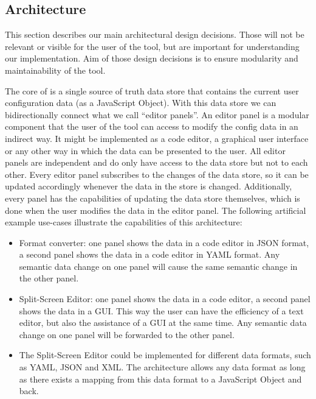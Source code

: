 




\subsection{Architecture}\label{subsec:architecture} %
This section describes our main architectural design decisions.
Those will not be relevant or visible for the user of the tool, but are important for understanding our implementation.
Aim of those design decisions is to ensure modularity and maintainability of the tool.

The core of \toolname{} is a single source of truth data store that contains the current user configuration data (as a JavaScript Object).
With this data store we can bidirectionally connect what we call ``editor panels''.
An editor panel is a modular component that the user of the tool can access to modify the config data in an indirect way.
It might be implemented as a code editor, a graphical user interface or any other way in which the data can be presented to the user.
All editor panels are independent and do only have access to the data store but not to each other.
Every editor panel subscribes to the changes of the data store, so it can be updated accordingly whenever the data in the store is changed.
Additionally, every panel has the capabilities of updating the data store themselves, which is done when the user modifies the data in the editor panel.
The following artificial example use-cases illustrate the capabilities of this architecture:

\begin{itemize}
    \item Format converter: one panel shows the data in a code editor in JSON format, a second panel shows the data in a code editor in YAML format. Any semantic data change on one panel will cause the same semantic change in the other panel.
    \item Split-Screen Editor: one panel shows the data in a code editor, a second panel shows the data in a GUI. This way the user can have the efficiency of a text editor, but also the assistance of a GUI at the same time. Any semantic data change on one panel will be forwarded to the other panel.
    \item The Split-Screen Editor could be implemented for different data formats, such as YAML, JSON and XML. The architecture allows any data format as long as there exists a mapping from this data format to a JavaScript Object and back.
\end{itemize}

